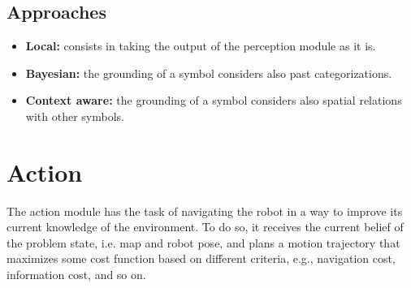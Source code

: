 \documentclass{article}
\begin{document}
	\subsection{Approaches}
	
	\begin{itemize}
		\item {\bf Local:} consists in taking the output of the perception module as it is.
		\item {\bf Bayesian:} the grounding of a symbol considers also past categorizations.
		\item {\bf Context aware:} the grounding of a symbol considers also spatial relations with other symbols.
	\end{itemize}
	
	\section{Action}
	
	The action module has the task of navigating the robot in a way to improve its current knowledge of the environment. To do so, it receives the current belief of the problem state, i.e. map and robot pose, and plans a motion trajectory that maximizes some cost function based on different criteria, e.g., navigation cost, information cost, and so on.
	
	\clearpage
	
	
	
	\clearpage
	
	
	
	
\end{document}
